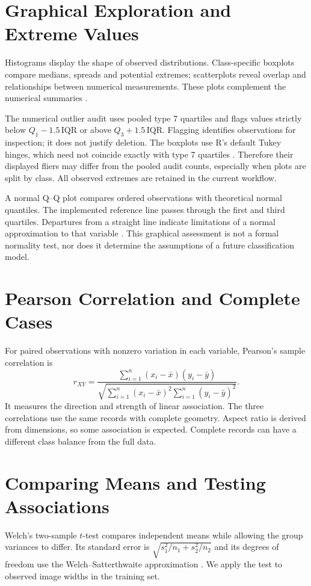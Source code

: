 \section{Graphical Exploration and Extreme Values}
Histograms display the shape of observed distributions. Class-specific
boxplots compare medians, spreads and potential extremes; scatterplots reveal
overlap and relationships between numerical measurements. These plots complement the numerical summaries \citep{nistHandbook}.

The numerical outlier audit uses pooled type 7 quartiles and flags values
strictly below $Q_1-1.5\,\mathrm{IQR}$ or above $Q_3+1.5\,\mathrm{IQR}$.
Flagging identifies observations for inspection; it does not justify deletion.
The boxplots use R's default Tukey hinges, which need not coincide exactly
with type 7 quartiles \citep{rBoxplot}. Therefore their displayed fliers may
differ from the pooled audit counts, especially when plots are split by class.
All observed extremes are retained in the current workflow.

A normal Q--Q plot compares ordered observations with theoretical normal
quantiles. The implemented reference line passes through the first and third
quartiles. Departures from a straight line indicate limitations of a normal
approximation to that variable \citep{rQQ}. This graphical assessment is not
a formal normality test, nor does it determine the assumptions of a future
classification model.

\section{Pearson Correlation and Complete Cases}
For paired observations with nonzero variation in each variable, Pearson's
sample correlation is
\begin{equation}
r_{XY}=\frac{\sum_{i=1}^{n}(x_i-\bar{x})(y_i-\bar{y})}
{\sqrt{\sum_{i=1}^{n}(x_i-\bar{x})^2\sum_{i=1}^{n}(y_i-\bar{y})^2}}.
\end{equation}
It measures the direction and strength of linear association. The three correlations use the same records with complete geometry.
Aspect ratio is derived from dimensions, so some association is expected.
Complete records can have a different class balance from the full data.


\section{Comparing Means and Testing Associations}
Welch's two-sample $t$-test compares independent means while allowing the
group variances to differ. Its standard error is
$\sqrt{s_1^2/n_1+s_2^2/n_2}$ and its degrees of freedom use the
Welch--Satterthwaite approximation \citep{rWelch}. We apply the test
to observed image widths in the training set.

